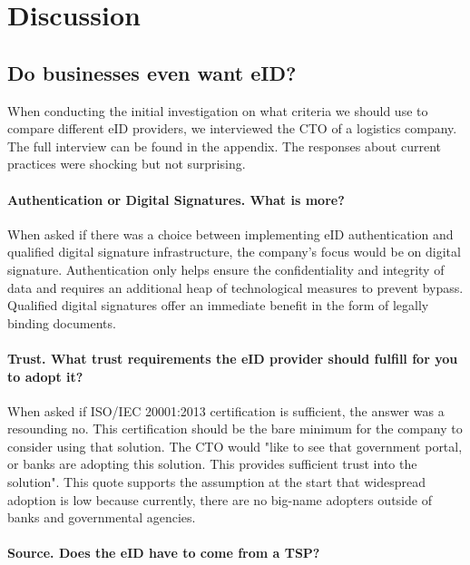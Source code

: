 \section{Discussion}

\subsection{Do businesses even want eID?}

When conducting the initial investigation on what criteria we should use to compare different eID providers, we interviewed the CTO of a logistics company. The full interview can be found in the appendix. The responses about current practices were shocking but not surprising.

\paragraph{Authentication or Digital Signatures. What is more?}

When asked if there was a choice between implementing eID authentication and qualified digital signature infrastructure, the company's focus would be on digital signature. Authentication only helps ensure the confidentiality and integrity of data and requires an additional heap of technological measures to prevent bypass. Qualified digital signatures offer an immediate benefit in the form of legally binding documents.

\paragraph{Trust. What trust requirements the eID provider should fulfill for you to adopt it?}

When asked if ISO/IEC 20001:2013 certification is sufficient, the answer was a resounding no. This certification should be the bare minimum for the company to consider using that solution. The CTO would "like to see that government portal, or banks are adopting this solution. This provides sufficient trust into the solution". This quote supports the assumption at the start that widespread adoption is low because currently, there are no big-name adopters outside of banks and governmental agencies.

\paragraph{Source. Does the eID have to come from a TSP?}

